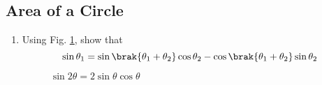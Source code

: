\subsection{Area of a Circle}
%
%
\renewcommand{\theequation}{\theenumi}
\begin{enumerate}[label=\arabic*.,ref=\thesubsection.\theenumi]
%
%
\item
	Using Fig. \ref{ch5_sin_theta}, show that 
\begin{equation}
\label{ch5_sin_theta_eq}
\sin  \theta_1 = \sin \brak{\theta_1 + \theta_2}\cos \theta_2 - \cos\brak{\theta_1+\theta_2}\sin\theta_2
\end{equation}	

\begin{figure}[!ht]
	\begin{center}
		
		\resizebox{\columnwidth}{!}{}
	\end{center}
	\caption{$\sin2\theta = 2\sin\theta\cos\theta$}
	\label{ch5_sin_theta}	
\end{figure}
%


\end{enumerate}
